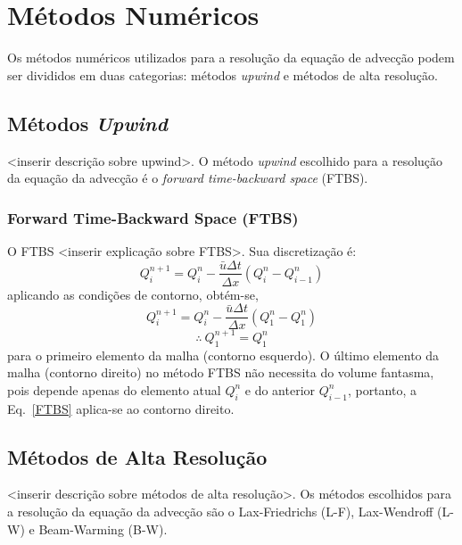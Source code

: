 \section{Métodos Numéricos}
Os métodos numéricos utilizados para a resolução da equação de advecção podem
ser divididos em duas categorias: métodos \textit{upwind} e métodos de alta
resolução.

\subsection{Métodos \textit{Upwind}}
<inserir descrição sobre upwind>. O método \textit{upwind} escolhido para a
resolução da equação da advecção é o \textit{forward time-backward space}
(FTBS).

\subsubsection{Forward Time-Backward Space (FTBS)}
O FTBS <inserir explicação sobre FTBS>. Sua discretização é:
\begin{equation}\label{FTBS}
    Q_i^{n+1} = Q_i^n - \frac{\bar{u}\Delta t}{\Delta x} \left(
        Q_i^n - Q_{i-1}^n
    \right)
\end{equation}
aplicando as condições de contorno, obtém-se,
\[
    Q_i^{n+1} = Q_i^n - \frac{\bar{u}\Delta t}{\Delta x} \left(
        Q_1^n - Q_1^n
    \right)
\]
\begin{equation}
    \therefore\ Q_1^{n+1} = Q_1^n
\end{equation}
para o primeiro elemento da malha (contorno esquerdo). O último elemento da
malha (contorno direito) no método FTBS não necessita do volume fantasma, pois
depende apenas do elemento atual $Q_i^n$ e do anterior $Q_{i-1}^n$, portanto, a
Eq.\ \ref{FTBS} aplica-se ao contorno direito.

\subsection{Métodos de Alta Resolução}
<inserir descrição sobre métodos de alta resolução>. Os métodos escolhidos para
a resolução da equação da advecção são o Lax-Friedrichs (L-F), Lax-Wendroff
(L-W) e Beam-Warming (B-W).

